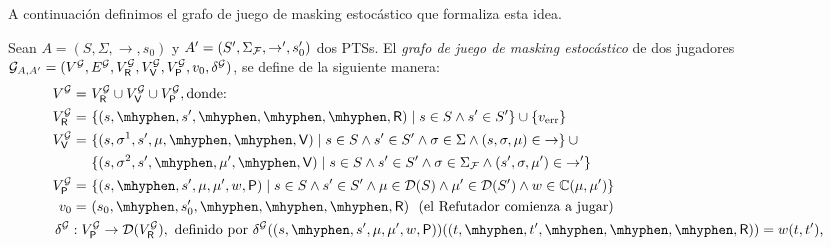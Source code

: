 A continuación definimos el grafo de juego de masking estocástico que formaliza esta idea.

\begin{definition} \label{def:strong_masking_game_graphi}
  Sean $A =( S, \Sigma, {\rightarrow}, s_0 )$ y
  $A' = ( S', \Sigma_{\mathcal{F}} , {\rightarrow'}, s'_0 )$ dos PTSs.
  El \emph{grafo de juego de masking estocástico} de dos jugadores
  $\mathcal{G}_{A,A'} = (V^{\mathcal{G}}, E^{\mathcal{G}}, V^{\mathcal{G}}_{\mathsf{R}}, V^{\mathcal{G}}_{\mathsf{V}}, V^{\mathcal{G}}_{\mathsf{P}}, v_0, \delta^{\mathcal{G}})$,
   se define de la siguiente manera:
%
  {\footnotesize%
  \begin{align*}
    V^\StochG = \
    & V^\StochG_\Refuter \cup V^\StochG_\Verifier \cup V^\StochG_\Probabilistic, \text{donde: }\\
    V^\StochG_\Refuter = \
    & \{ (s, \mhyphen, s', \mhyphen, \mhyphen, \mhyphen, \Refuter) \mid
          s \in S \wedge s' \in S' \} \cup
      \{\ErrorSt\}\\
    V^\StochG_\Verifier = \
    & \{ (s, \sigma^1, s', \mu, \mhyphen, \mhyphen, \Verifier) \mid
         s \in S \wedge s' \in S'
         \wedge \sigma \in \Sigma
         \wedge (s, \sigma, \mu) \in {\rightarrow} \} \cup {} \\
    & \{ (s, \sigma^2, s', \mhyphen, \mu', \mhyphen, \Verifier) \mid
         s \in S \wedge s' \in S'
         \wedge \sigma \in \SigmaF
         \wedge (s', \sigma, \mu') \in {\rightarrow'}\}\\
    V^\StochG_\Probabilistic = \
    & \{ (s, \mhyphen, s', \mu, \mu', w, \Probabilistic) \mid
         s \in S \wedge s' \in S' \wedge %
         \mu \in \Dist(S) \wedge \mu' \in \Dist(S')
         \wedge w \in \couplings{\mu}{\mu'}\}\\
    \InitVertex = \
    & ( s_0, \mhyphen, s'_0, \mhyphen, \mhyphen, \mhyphen, \Refuter )
    \text{ \ (el Refutador comienza a jugar)}\\
    & \hspace{-2.6em}
    \delta^\StochG : V^\StochG_\Probabilistic \rightarrow \Dist(V^\StochG_\Refuter),
      \text{ definido por } 
      \delta^\StochG((s, \mhyphen, s', \mu, \mu', w, \Probabilistic))((t, \mhyphen, t', \mhyphen, \mhyphen, \mhyphen, \Refuter)) = w(t,t')
      \text{,}
  \end{align*}
}
\end{definition}
